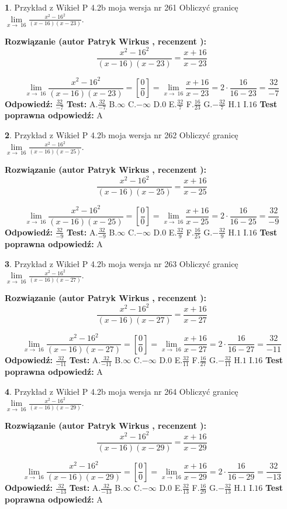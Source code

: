 \documentclass[12pt, a4paper]{article}
\theoremstyle{definition} %
\newtheorem{zad}{}
\newcommand{\zadStart}[1]{\begin{zad}#1\newline}
\newcommand{\zadStop}{\end{zad}}
\newcommand{\rozwStart}[2]{\noindent \textbf{Rozwiązanie (autor #1 , recenzent #2): }\newline}
\newcommand{\rozwStop}{\newline}
\newcommand{\odpStart}{\noindent \textbf{Odpowiedź:}\newline}
\newcommand{\odpStop}{\newline}
\newcommand{\testStart}{\noindent \textbf{Test:}\newline}
\newcommand{\testStop}{\newline}
\newcommand{\kluczStart}{\noindent \textbf{Test poprawna odpowiedź:}\newline}
\newcommand{\kluczStop}{\newline}
\begin{document}
\zadStart{Przykład z Wikieł P 4.2b moja wersja nr 261}
Obliczyć granicę $\lim\limits_{x\to\ 16}\frac{x^{2}-16^{2}}{(x-16)(x-23)}$.
\zadStop
\rozwStart{Patryk Wirkus}{}
$$\frac{x^{2}-16^{2}}{(x-16)(x-23)}=\frac{x+16}{x-23}$$

$$\lim\limits_{x\to\ 16}\frac{x^{2}-16^{2}}{(x-16)(x-23)}=[\frac{0}{0}]=\lim\limits_{x\to\ 16}\frac{x+16}{x-23}=2 \cdot \frac{16}{16-23} = \frac{32}{-7}$$
\rozwStop
\odpStart
$\frac{32}{-7}$
\odpStop
\testStart
A.$\frac{32}{-7}$
B.$\infty$
C.$-\infty$
D.$0$
E.$\frac{32}{7}$
F.$\frac{16}{23}$
G.$-\frac{32}{7}$
H.$1$
I.$16$
\testStop
\kluczStart
A
\kluczStop



\zadStart{Przykład z Wikieł P 4.2b moja wersja nr 262}
Obliczyć granicę $\lim\limits_{x\to\ 16}\frac{x^{2}-16^{2}}{(x-16)(x-25)}$.
\zadStop
\rozwStart{Patryk Wirkus}{}
$$\frac{x^{2}-16^{2}}{(x-16)(x-25)}=\frac{x+16}{x-25}$$

$$\lim\limits_{x\to\ 16}\frac{x^{2}-16^{2}}{(x-16)(x-25)}=[\frac{0}{0}]=\lim\limits_{x\to\ 16}\frac{x+16}{x-25}=2 \cdot \frac{16}{16-25} = \frac{32}{-9}$$
\rozwStop
\odpStart
$\frac{32}{-9}$
\odpStop
\testStart
A.$\frac{32}{-9}$
B.$\infty$
C.$-\infty$
D.$0$
E.$\frac{32}{9}$
F.$\frac{16}{25}$
G.$-\frac{32}{9}$
H.$1$
I.$16$
\testStop
\kluczStart
A
\kluczStop



\zadStart{Przykład z Wikieł P 4.2b moja wersja nr 263}
Obliczyć granicę $\lim\limits_{x\to\ 16}\frac{x^{2}-16^{2}}{(x-16)(x-27)}$.
\zadStop
\rozwStart{Patryk Wirkus}{}
$$\frac{x^{2}-16^{2}}{(x-16)(x-27)}=\frac{x+16}{x-27}$$

$$\lim\limits_{x\to\ 16}\frac{x^{2}-16^{2}}{(x-16)(x-27)}=[\frac{0}{0}]=\lim\limits_{x\to\ 16}\frac{x+16}{x-27}=2 \cdot \frac{16}{16-27} = \frac{32}{-11}$$
\rozwStop
\odpStart
$\frac{32}{-11}$
\odpStop
\testStart
A.$\frac{32}{-11}$
B.$\infty$
C.$-\infty$
D.$0$
E.$\frac{32}{11}$
F.$\frac{16}{27}$
G.$-\frac{32}{11}$
H.$1$
I.$16$
\testStop
\kluczStart
A
\kluczStop



\zadStart{Przykład z Wikieł P 4.2b moja wersja nr 264}
Obliczyć granicę $\lim\limits_{x\to\ 16}\frac{x^{2}-16^{2}}{(x-16)(x-29)}$.
\zadStop
\rozwStart{Patryk Wirkus}{}
$$\frac{x^{2}-16^{2}}{(x-16)(x-29)}=\frac{x+16}{x-29}$$

$$\lim\limits_{x\to\ 16}\frac{x^{2}-16^{2}}{(x-16)(x-29)}=[\frac{0}{0}]=\lim\limits_{x\to\ 16}\frac{x+16}{x-29}=2 \cdot \frac{16}{16-29} = \frac{32}{-13}$$
\rozwStop
\odpStart
$\frac{32}{-13}$
\odpStop
\testStart
A.$\frac{32}{-13}$
B.$\infty$
C.$-\infty$
D.$0$
E.$\frac{32}{13}$
F.$\frac{16}{29}$
G.$-\frac{32}{13}$
H.$1$
I.$16$
\testStop
\kluczStart
A
\kluczStop
\end{document}
